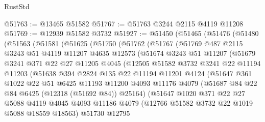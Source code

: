 \begin{lexlean}{RustStd}
\begin{coremodule}
@51763 := @13465 @51582
@51767 := @51763 @3244 @2115 @4119 @11208
@51769 := @12939 @51582 @3732
@51927 := @51450
    (@51465
      (@51476
        (@51480
          (@51563
            (@51581
              (@51625
                (@51750
                  (@51762
                    (@51767
                      (@51769
                        @487
                        @2115
                        @3243
                        @51
                        @4119
                        @11207
                        @4635
                        @12573
                        (@51674
                          @3243
                          @51
                          @11207
                          (@51679
                            @3241
                            @371
                            @22
                            @27
                            @11205
                            @4045
                            (@12505
                              @51582
                              @3732
                              @3241
                              @22
                              @11194
                              @11203
                              (@51638
                                @394
                                @2824
                                @135
                                @22
                                @11194
                                @11201
                                @4124
                                (@51647
                                  @361
                                  @1022
                                  @22
                                  @51
                                  @6425
                                  @11193
                                  @11200
                                  @4093
                                  @11176
                                  @4079
                                  (@51687 @84 @22 @84 @6425 (@12318 (@51692 @84)) @25164)
                                  (@51647
                                    @1020
                                    @371
                                    @22
                                    @27
                                    @5088
                                    @4119
                                    @4045
                                    @4093
                                    @11186
                                    @4079
                                    (@12766 @51582 @3732 @22 @1019 @5088 @18559 @18563)
                                    @51730
                                    @12795

\end{coremodule}
\end{lexlean}
